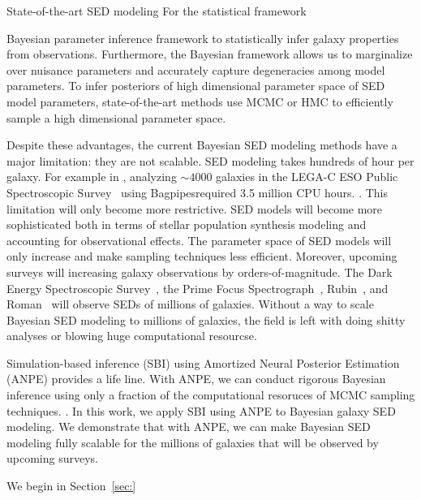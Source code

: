 State-of-the-art SED modeling 
For the statistical framework 

Bayesian parameter
inference framework to statistically infer galaxy properties from observations.
Furthermore, the Bayesian framework allows us to marginalize over nuisance
parameters and accurately capture degeneracies among model parameters. 
To infer posteriors of high dimensional parameter space of SED model
parameters, state-of-the-art methods use MCMC or HMC to efficiently sample a
high dimensional parameter space. 

Despite these advantages, the current Bayesian SED modeling methods have a
major limitation: they are not scalable. 
SED modeling takes hundreds of hour per galaxy. 
For example in \cite{}, analyzing $\sim 4000$ galaxies in the LEGA-C ESO
Public Spectroscopic Survey~\cite{} using {\sc Bagpipes}required 3.5 million
CPU hours.
.
This limitation will only become more restrictive. 
SED models will become more sophisticated both in terms of stellar population
synthesis modeling and accounting for observational effects.  
The parameter space of SED models will only increase and make sampling
techniques less efficient. 
Moreover, upcoming surveys will increasing galaxy observations by
orders-of-magnitude.
The Dark Energy Spectroscopic Survey~\citep[DESI;][]{desicollaboration2016},
the Prime Focus Spectrograph~\citep[PFS;][]{takada2014},
Rubin~, and Roman~ will observe SEDs of
millions of galaxies. 
Without a way to scale Bayesian SED modeling to millions of galaxies, the field
is left with doing shitty analyses or blowing huge computational resourcse. 

Simulation-based inference (SBI) using Amortized Neural Posterior Estimation
(ANPE) provides a life line. 
With ANPE, we can conduct rigorous Bayesian inference using only a fraction of
the computational resoruces of MCMC sampling techniques.
. 
In this work, we apply SBI using ANPE to Bayesian galaxy SED modeling. 
We demonstrate that with ANPE, we can make Bayesian SED modeling fully scalable
for the millions of galaxies that will be observed by upcoming surveys.

We begin in Section~\ref{sec:}



